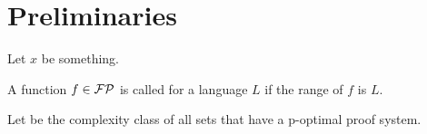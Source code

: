 \chapter{Preliminaries}
  Let \(x\) be something.

  \begin{definition}
    A function \(f \in \mathcal{FP}\) is called  for a language \(L\) if the range of \(f\) is \(L\).
  \end{definition}

  \begin{definition}[OPT]
    Let  be the complexity class of all sets that have a p-optimal proof system.
  \end{definition}

